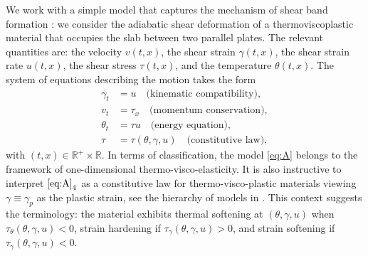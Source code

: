 \documentclass[graybox]{svmult}
\begin{document}
We work with a simple model that captures the mechanism of shear band formation : we consider the  adiabatic shear deformation  of a  thermoviscoplastic material that occupies the slab between two parallel plates. The relevant quantities are: the velocity $v(t,x)$, the shear strain $\gamma(t,x)$, 
 the shear strain rate $u(t,x)$, the shear stress $\tau(t,x)$,  and the temperature $\theta(t,x)$. The system of equations describing the motion takes the form
\begin{equation} \label{eq:A}\tag{A}
\begin{aligned}
 \gamma_t &= u \quad \text{(kinematic compatibility)}, 	\\
 v_t &= \tau_x \quad \text{(momentum conservation)}, 	\\
 \theta_t &= \tau u \quad \text{(energy equation)},	\\
 \tau &=\tau(\theta,\gamma,u) \quad \text{(constitutive law)},			
\end{aligned}
\end{equation}
with $(t,x) \in \mathbb{R}^+\times \mathbb{R}$. In terms of classification, the model \eqref{eq:A} belongs to the framework of one-dimensional thermo-visco-elasticity. 
It is also instructive to interpret $\eqref{eq:A}_4$ as a constitutive law for thermo-visco-plastic materials 
viewing $\gamma \equiv \gamma_p$ as the plastic strain, see the hierarchy of models in \cite{KT09,tzavaras_nonlinear_1992}.
This context suggests the terminology: the material exhibits thermal softening at $(\theta,\gamma,u)$ when $\tau_\theta(\theta,\gamma,u)<0$, strain hardening if $\tau_\gamma(\theta,\gamma,u)>0$, and strain softening if $\tau_\gamma(\theta,\gamma,u)<0$.
\end{document}
